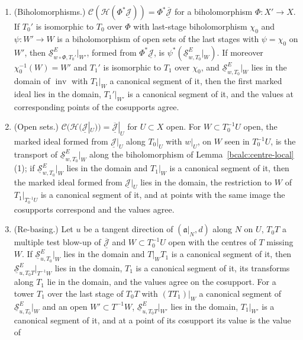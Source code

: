 \begin{theorem}
\begin{enumerate}
\item (Biholomorphisms.) \(\mathcal C(\mathcal H(\Phi^*\underline{\mathcal J}))=\Phi^*\overline{\underline{\mathcal J}}\) for a biholomorphism \(\Phi\colon X'\to X\). If \(T_0'\) is isomorphic to
\(T_0\) over \(\Phi\) with last-stage biholomorphism \(\chi_0\) and \(\psi\colon W'\to W\) is a biholomorphism of open sets of the last stages with \(\psi=\chi_0\) on \(W'\),
then \(\underline{\mathcal S}^{E}_{w\circ\Phi,T_0'}|_{W'}\), formed from \(\Phi^*\underline{\mathcal J}\), is \(\psi^*(\underline{\mathcal S}^E_{w,T_0}|_W)\). If moreover
\(\chi_0^{-1}(W)=W'\) and \(T_1'\) is isomorphic to \(T_1\) over \(\chi_0\), and \(\underline{\mathcal S}^E_{w,T_0}|_W\) lies in the domain of \(\operatorname{inv}\) with \(T_1|_W\) a
canonical segment of it, then the first marked ideal lies in the domain, \(T_1'|_{W'}\) is a canonical segment of it, and the values at corresponding points of the
cosupports agree.
\item (Open sets.) \(\mathcal C(\mathcal H(\underline{\mathcal J}|_U))=\overline{\underline{\mathcal J}}|_U\) for \(U\subset X\) open. For \(W\subset T_0^{-1}U\) open, the marked ideal formed
from \(\underline{\mathcal J}|_U\) along \(T_0|_U\) with \(w|_U\), on \(W\) seen in \(T_0^{-1}U\), is the transport of \(\underline{\mathcal S}^E_{w,T_0}|_W\) along the biholomorphism of
Lemma~\ref{bcalc:centre-local}(1); if \(\underline{\mathcal S}^E_{w,T_0}|_W\) lies in the domain and \(T_1|_W\) is a canonical segment of it, then the marked ideal formed from
\(\underline{\mathcal J}|_U\) lies in the domain, the restriction to \(W\) of \(T_1|_{T_0^{-1}U}\) is a canonical segment of it, and at points with the same image the cosupports
correspond and the values agree.
\item (Re-basing.) Let \(u\) be a tangent direction of \((\mathfrak a|_N,d)\) along \(N\) on \(U\), \(T_0T\) a multiple test blow-up of \(\overline{\underline{\mathcal J}}\) and
\(W\subset T_0^{-1}U\) open with the centres of \(T\) missing \(W\). If \(\underline{\mathcal S}^E_{u,T_0}|_W\) lies in the domain and \(T|_WT_1\) is a canonical segment of it, then
\(\underline{\mathcal S}^E_{u,T_0T}|_{T^{-1}W}\) lies in the domain, \(T_1\) is a canonical segment of it, its transforms along \(T_1\) lie in the domain, and the values agree on the
cosupport. For a tower \(T_1\) over the last stage of \(T_0T\) with \((TT_1)|_W\) a canonical segment of \(\underline{\mathcal S}^E_{u,T_0}|_W\) and an open \(W'\subset T^{-1}W\),
\(\underline{\mathcal S}^E_{u,T_0T}|_{W'}\) lies in the domain, \(T_1|_{W'}\) is a canonical segment of it, and at a point of its cosupport its value is the value of

\end{enumerate}
\end{theorem}
